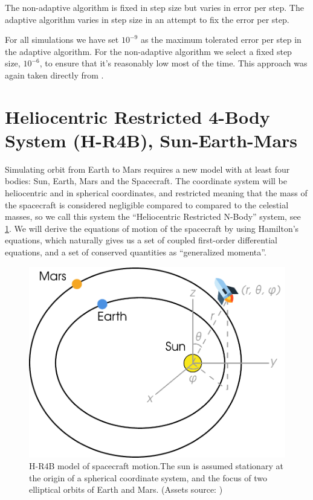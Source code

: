 The non-adaptive algorithm is fixed in step size but varies in error per step.
The adaptive algorithm varies in step size in an attempt to fix the error per step.

For all simulations we have set $10^{-9}$ as the maximum tolerated error per step in the adaptive algorithm. For the non-adaptive algorithm we select a fixed step size, $10^{-6}$, to ensure that it's reasonably low most of the time. This approach was again taken directly from \cite{Saxe2015}.

\section{Heliocentric Restricted 4-Body System (H-R4B), Sun-Earth-Mars}
Simulating orbit from Earth to Mars requires a new model with at least four bodies: Sun, Earth, Mars and the Spacecraft. The coordinate system will be heliocentric and in spherical coordinates, and restricted meaning that the mass of the spacecraft is considered negligible compared to compared to the celestial masses, so we call this system the ``Heliocentric Restricted N-Body'' system, see \cref{fig:solar-system-model}. We will derive the equations of motion of the spacecraft by using Hamilton's equations, which naturally gives us a set of coupled first-order differential equations, and a set of conserved quantities as ``generalized momenta''.

\begin{figure}[ht]
    \centering
    \includegraphics[width=0.80\linewidth]{fig/solar-system-model}
    \caption{ H-R4B model of spacecraft motion.The sun is assumed stationary at the origin of a spherical coordinate system, and the focus of two elliptical orbits of Earth and Mars. (Assets source: \cite{WikiSpherical,flaticon})}
    \label{fig:solar-system-model}
\end{figure}

